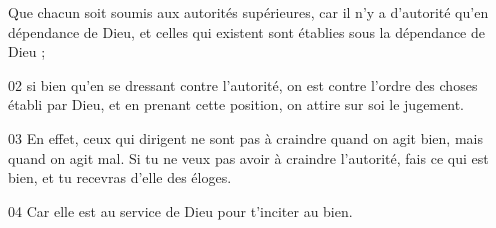 Que chacun soit soumis aux autorités supérieures, car il n’y a d’autorité qu’en dépendance de Dieu, et celles qui existent sont établies sous la dépendance de Dieu ;

02 si bien qu’en se dressant contre l’autorité, on est contre l’ordre des choses établi par Dieu, et en prenant cette position, on attire sur soi le jugement.

03 En effet, ceux qui dirigent ne sont pas à craindre quand on agit bien, mais quand on agit mal. Si tu ne veux pas avoir à craindre l’autorité, fais ce qui est bien, et tu recevras d’elle des éloges.

04 Car elle est au service de Dieu pour t’inciter au bien. 